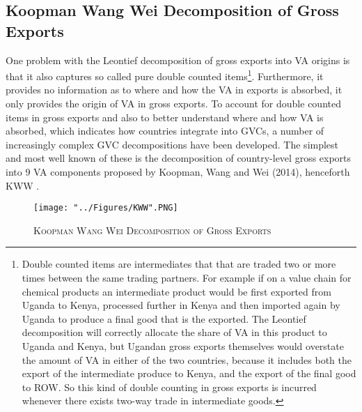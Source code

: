 \documentclass[a4paper]{article}
\begin{document}
\subsection{Koopman Wang Wei Decomposition of Gross Exports}
One problem with the Leontief decomposition of gross exports into VA origins is that it also captures so called pure double counted items\footnote{Double counted items are intermediates that that are traded two or more times between the same trading partners. For example if on a value chain for chemical products an intermediate product would be first exported from Uganda to Kenya, processed further in Kenya and then imported again by Uganda to produce a final good that is the exported. The Leontief decomposition will correctly allocate the share of VA in this product to Uganda and Kenya, but Ugandan gross exports themselves would overstate the amount of VA in either of the two countries, because it includes both the export of the intermediate produce to Kenya, and the export of the final good to ROW. So this kind of double counting in gross exports is incurred whenever there exists two-way trade in intermediate goods.}. %
Furthermore, it provides no information as to where and how the VA in exports is absorbed, it only provides the origin of VA in gross exports. To account for double counted items in gross exports and also to better understand where and how VA is absorbed, which indicates how countries integrate into GVCs, a number of increasingly complex GVC decompositions have been developed. The simplest and most well known of these is the decomposition of country-level gross exports into 9 VA components proposed by Koopman, Wang and Wei (2014), henceforth KWW \citep{koopman2014tracing}.

\begin{figure}[h!]
\centering
\caption{\label{fig:KWW}\textsc{Koopman Wang Wei Decomposition of Gross Exports}}
\texttt{[image: "../Figures/KWW".PNG]} %
\end{figure}
\FloatBarrier
\end{document}
